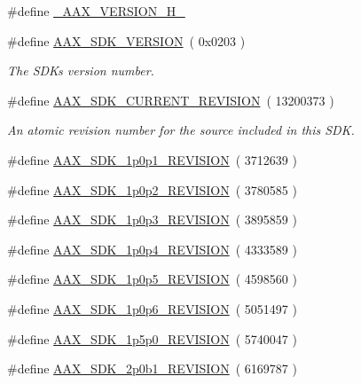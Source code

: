 \begin{DoxyCompactItemize}
\item 
\#define \hyperlink{a00308_aa2233aa6f57ff48373eddf8aeda68919}{\+\_\+\+A\+A\+X\+\_\+\+V\+E\+R\+S\+I\+O\+N\+\_\+\+H\+\_\+}
\item 
\#define \hyperlink{a00308_aeff268cb7f4d2cc612df086c22b0f1f2}{A\+A\+X\+\_\+\+S\+D\+K\+\_\+\+V\+E\+R\+S\+I\+O\+N}~( 0x0203 )
\begin{DoxyCompactList}\small\item\em The S\+D\+K\textquotesingle{}s version number. \end{DoxyCompactList}\item 
\#define \hyperlink{a00308_a7ae13fba5243735a59c3a4dc2554a36f}{A\+A\+X\+\_\+\+S\+D\+K\+\_\+\+C\+U\+R\+R\+E\+N\+T\+\_\+\+R\+E\+V\+I\+S\+I\+O\+N}~( 13200373 )
\begin{DoxyCompactList}\small\item\em An atomic revision number for the source included in this S\+D\+K. \end{DoxyCompactList}\item 
\#define \hyperlink{a00308_a3f59e1c5a5a7563eeefe64b5781eba93}{A\+A\+X\+\_\+\+S\+D\+K\+\_\+1p0p1\+\_\+\+R\+E\+V\+I\+S\+I\+O\+N}~( 3712639 )
\item 
\#define \hyperlink{a00308_a978161f0a212f7c241e1bf22ceb25186}{A\+A\+X\+\_\+\+S\+D\+K\+\_\+1p0p2\+\_\+\+R\+E\+V\+I\+S\+I\+O\+N}~( 3780585 )
\item 
\#define \hyperlink{a00308_a95836b2270a2260faea2ce72723e270d}{A\+A\+X\+\_\+\+S\+D\+K\+\_\+1p0p3\+\_\+\+R\+E\+V\+I\+S\+I\+O\+N}~( 3895859 )
\item 
\#define \hyperlink{a00308_a82fcd612ff0206d62a970291eeec3f4f}{A\+A\+X\+\_\+\+S\+D\+K\+\_\+1p0p4\+\_\+\+R\+E\+V\+I\+S\+I\+O\+N}~( 4333589 )
\item 
\#define \hyperlink{a00308_ad5b3e00e4e86f396974336a66a3cc571}{A\+A\+X\+\_\+\+S\+D\+K\+\_\+1p0p5\+\_\+\+R\+E\+V\+I\+S\+I\+O\+N}~( 4598560 )
\item 
\#define \hyperlink{a00308_acb9944d960382eedc31c88615f56f011}{A\+A\+X\+\_\+\+S\+D\+K\+\_\+1p0p6\+\_\+\+R\+E\+V\+I\+S\+I\+O\+N}~( 5051497 )
\item 
\#define \hyperlink{a00308_a2a9775ce5518c002c9d101e7c29a57dc}{A\+A\+X\+\_\+\+S\+D\+K\+\_\+1p5p0\+\_\+\+R\+E\+V\+I\+S\+I\+O\+N}~( 5740047 )
\item 
\#define \hyperlink{a00308_a513661fadde1e27472578741905b857c}{A\+A\+X\+\_\+\+S\+D\+K\+\_\+2p0b1\+\_\+\+R\+E\+V\+I\+S\+I\+O\+N}~( 6169787 )
\item 

\end{DoxyCompactItemize}
